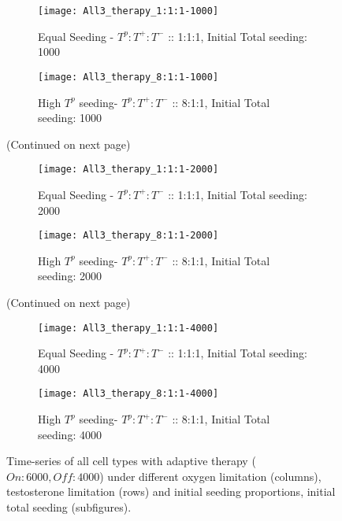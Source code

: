\begin{figure}[h!]
  \centering
  \begin{subfigure}[b]{\textwidth}
    \centering
    \texttt{[image: All3\_therapy\_1:1:1-1000]}
    \caption{Equal Seeding - $T^p:T^+:T^-$ :: 1:1:1, Initial Total seeding: 1000}
    \label{fig_therapy-AT_1:1:1-1000}
  \end{subfigure}
  \begin{subfigure}[b]{\textwidth}
    \centering
    \texttt{[image: All3\_therapy\_8:1:1-1000]}
    \caption{High $T^p$ seeding- $T^p:T^+:T^-$ :: 8:1:1, Initial Total seeding: 1000}
    \label{fig_therapy-AT_8:1:1-1000}
  \end{subfigure}
  \caption[]{(Continued on next page)}
\end{figure}
\begin{figure}[h!]\ContinuedFloat
  \centering
  \begin{subfigure}[b]{\textwidth}
    \centering
    \texttt{[image: All3\_therapy\_1:1:1-2000]}
    \caption{Equal Seeding - $T^p:T^+:T^-$ :: 1:1:1, Initial Total seeding: 2000}
    \label{fig_therapy-AT_1:1:1-2000}
  \end{subfigure}
  \begin{subfigure}[b]{\textwidth}
    \centering
    \texttt{[image: All3\_therapy\_8:1:1-2000]}
    \caption{High $T^p$ seeding- $T^p:T^+:T^-$ :: 8:1:1, Initial Total seeding: 2000}
    \label{fig_therapy-AT_8:1:1-2000}
  \end{subfigure}
  \caption[]{(Continued on next page)}
\end{figure}
\begin{figure}[h!]\ContinuedFloat
  \centering
  \begin{subfigure}[b]{\textwidth}
    \centering
    \texttt{[image: All3\_therapy\_1:1:1-4000]}
    \caption{Equal Seeding - $T^p:T^+:T^-$ :: 1:1:1, Initial Total seeding: 4000}
    \label{fig_therapy-AT_1:1:1-4000}
  \end{subfigure}
  \begin{subfigure}[b]{\textwidth}
    \centering
    \texttt{[image: All3\_therapy\_8:1:1-4000]}
    \caption{High $T^p$ seeding- $T^p:T^+:T^-$ :: 8:1:1, Initial Total seeding: 4000}
    \label{fig_therapy-AT_8:1:1-4000}
  \end{subfigure}
  \caption[Time-series of all cell types with adaptive therapy]{Time-series of all cell types with adaptive therapy ($On:6000, Off:4000$) under different oxygen limitation (columns), testosterone limitation (rows) and initial seeding proportions, initial total seeding (subfigures).}
  \label{fig_therapy-AT}
\end{figure}

